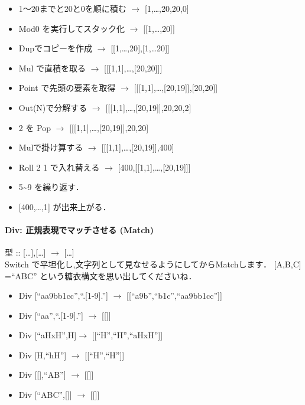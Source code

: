 \begin{itemize}
\item
  1〜20までと20と0を順に積む $\to$ {[}1,\ldots{},20,20,0{]}
\item
  Mod0 を実行してスタック化 $\to$ {[}{[}1,\ldots{},20{]}{]}
\item
  Dupでコピーを作成 $\to$
  {[}{[}1,\ldots{},20{]},{[}1,\ldots{}20{]}{]}
\item
  Mul で直積を取る $\to$
  {[}{[}{[}1,1{]},\ldots{},{[}20,20{]}{]}{]}
\item
  Point で先頭の要素を取得 $\to$
  {[}{[}{[}1,1{]},\ldots{},{[}20,19{]}{]},{[}20,20{]}{]}
\item
  Out(N)で分解する $\to$
  {[}{[}{[}1,1{]},\ldots{},{[}20,19{]}{]},20,20,2{]}
\item
  2 を Pop $\to$
  {[}{[}{[}1,1{]},\ldots{},{[}20,19{]}{]},20,20{]}
\item
  Mulで掛け算する $\to$
  {[}{[}{[}1,1{]},\ldots{},{[}20,19{]}{]},400{]}
\item
  Roll 2 1 で入れ替える $\to$
  {[}400,{[}{[}1,1{]},\ldots{},{[}20,19{]}{]}{]}
\item
  5\textasciitilde{}9 を繰り返す．
\item
  {[}400,\ldots{},1{]} が出来上がる．
\end{itemize}

\paragraph{Div: 正規表現でマッチさせる (Match)}

型 :: {[}\ldots{}{]},{[}\ldots{}{]} $\to$
{[}\ldots{}{]}\\Switch
で平坦化し,文字列として見なせるようにしてからMatchします． {[}A,B,C{]}
=``ABC'' という糖衣構文を思い出してくださいね．

\begin{itemize}
\item
  Div {[}``aa9bb1cc'',``.{[}1-9{]}.''{]} $\to$
  {[}{[}``a9b'',``b1c'',``aa9bb1cc''{]}{]}
\item
  Div {[}``aa'',``.{[}1-9{]}.''{]} $\to$ {[}{[}{]}{]}
\item
  Div {[}``aHxH'',H{]}$\to$ {[}{[}``H'',``H'',``aHxH''{]}{]}
\item
  Div {[}H,``h\textbar{}H''{]} $\to$ {[}{[}``H'',``H''{]}{]}
\item
  Div {[}{[}{]},``A\textbar{}B''{]} $\to$ {[}{[}{]}{]}
\item
  Div {[}``ABC'',{[}{]}{]} $\to$ {[}{[}{]}{]}
\end{itemize}


